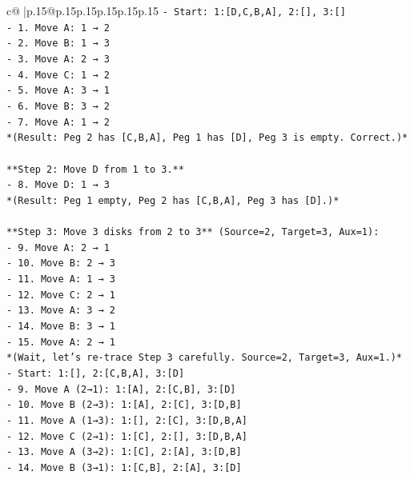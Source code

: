 \documentclass{article}
\begin{document}
{\begin{supertabular}{c@{$\;$}|p{.15\linewidth}@{}p{.15\linewidth}p{.15\linewidth}p{.15\linewidth}p{.15\linewidth}p{.15\linewidth}}
{{{\texttt{{-} Start: 1:{[}D,C,B,A{]}, 2:{[}{]}, 3:{[}{]}} \\
\texttt{{-} 1. Move A: 1 → 2} \\
\texttt{{-} 2. Move B: 1 → 3} \\
\texttt{{-} 3. Move A: 2 → 3} \\
\texttt{{-} 4. Move C: 1 → 2} \\
\texttt{{-} 5. Move A: 3 → 1} \\
\texttt{{-} 6. Move B: 3 → 2} \\
\texttt{{-} 7. Move A: 1 → 2} \\
\texttt{*(Result: Peg 2 has {[}C,B,A{]}, Peg 1 has {[}D{]}, Peg 3 is empty. Correct.)*} \\
\\ 
\texttt{**Step 2: Move D from 1 to 3.**} \\
\texttt{{-} 8. Move D: 1 → 3} \\
\texttt{*(Result: Peg 1 empty, Peg 2 has {[}C,B,A{]}, Peg 3 has {[}D{]}.)*} \\
\\ 
\texttt{**Step 3: Move 3 disks from 2 to 3** (Source=2, Target=3, Aux=1):} \\
\texttt{{-} 9. Move A: 2 → 1} \\
\texttt{{-} 10. Move B: 2 → 3} \\
\texttt{{-} 11. Move A: 1 → 3} \\
\texttt{{-} 12. Move C: 2 → 1} \\
\texttt{{-} 13. Move A: 3 → 2} \\
\texttt{{-} 14. Move B: 3 → 1} \\
\texttt{{-} 15. Move A: 2 → 1} \\
\texttt{*(Wait, let's re{-}trace Step 3 carefully. Source=2, Target=3, Aux=1.)*} \\
\texttt{{-} Start: 1:{[}{]}, 2:{[}C,B,A{]}, 3:{[}D{]}} \\
\texttt{{-} 9. Move A (2→1): 1:{[}A{]}, 2:{[}C,B{]}, 3:{[}D{]}} \\
\texttt{{-} 10. Move B (2→3): 1:{[}A{]}, 2:{[}C{]}, 3:{[}D,B{]}} \\
\texttt{{-} 11. Move A (1→3): 1:{[}{]}, 2:{[}C{]}, 3:{[}D,B,A{]}} \\
\texttt{{-} 12. Move C (2→1): 1:{[}C{]}, 2:{[}{]}, 3:{[}D,B,A{]}} \\
\texttt{{-} 13. Move A (3→2): 1:{[}C{]}, 2:{[}A{]}, 3:{[}D,B{]}} \\
\texttt{{-} 14. Move B (3→1): 1:{[}C,B{]}, 2:{[}A{]}, 3:{[}D{]}} \\
}}}
\end{supertabular}}
\end{document}
